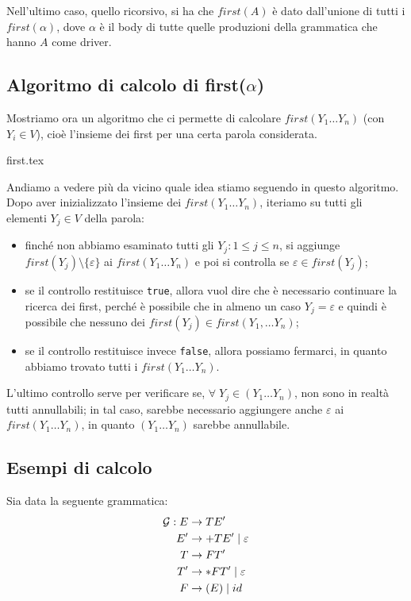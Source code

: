 \documentclass[class=book, crop=false, oneside, 12pt]{standalone}
\begin{document}
    Nell'ultimo caso, quello ricorsivo, si ha che \(first(A)\) è dato dall'unione di tutti i \(first(\alpha)\), dove \(\alpha\) è il body di tutte quelle produzioni della grammatica che hanno \(A\) come driver.

\subsection{Algoritmo di calcolo di first(\(\alpha\))}

Mostriamo ora un algoritmo che ci permette di calcolare \(first(Y_1 \ldots Y_n)\) (con \(Y_i \in V\)), cioè l'insieme dei first per una certa parola considerata.

{first.tex}

Andiamo a vedere più da vicino quale idea stiamo seguendo in questo algoritmo. Dopo aver inizializzato l'insieme dei \(first(Y_1 \ldots Y_n)\), iteriamo su tutti gli elementi \(Y_j \in V\) della parola: 
\begin{itemize}
    \item finché non abbiamo esaminato tutti gli \(Y_j : 1 \leq j \leq n\), si aggiunge \(first(Y_j) \setminus\{\varepsilon\}\) ai \(first(Y_1 \ldots Y_n)\) e poi si controlla se \(\varepsilon \in first(Y_j)\);
    \item se il controllo restituisce \texttt{true}, allora vuol dire che è necessario continuare la ricerca dei first, perché è possibile che in almeno un caso \(Y_j = \varepsilon\) e quindi è possibile che nessuno dei \(first(Y_j) \in first(Y_1, \ldots Y_n)\);
    \item se il controllo restituisce invece \texttt{false}, allora possiamo fermarci, in quanto abbiamo trovato tutti i \(first(Y_1 \ldots Y_n)\).
\end{itemize} 
L'ultimo controllo serve per verificare se, \(\forall\; Y_j \in (Y_1 \ldots Y_n)\), non sono in realtà tutti annullabili; in tal caso, sarebbe necessario aggiungere anche \(\varepsilon\) ai \(first(Y_1 \ldots Y_n)\), in quanto \((Y_1 \ldots Y_n)\) sarebbe annullabile.

\subsection{Esempi di calcolo}
Sia data la seguente grammatica:
\begin{align*}
    \mathcal{G}: E &\rightarrow TE' \\
    E' &\rightarrow +TE' \mid \varepsilon \\
    T &\rightarrow FT' \\
    T' &\rightarrow *FT' \mid \varepsilon\\
    F &\rightarrow (E) \mid id
\end{align*}
\end{document}
